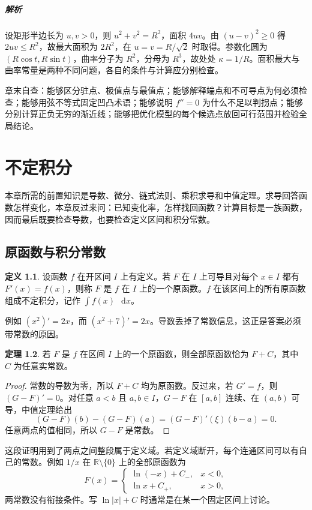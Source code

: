 \documentclass[UTF8,fontset=fandol,12pt,oneside,openany]{ctexrep}
\newcommand{\R}{\mathbb R}
\newcommand{\dd}{\mathop{}\!\mathrm d}
\theoremstyle{definition}
\newtheorem{theorem}{定理}[chapter]
\newtheorem{definition}[theorem]{定义}
\begin{document}
\paragraph{解析}设矩形半边长为 $u,v>0$，则 $u^2+v^2=R^2$，面积 $4uv$。由 $(u-v)^2\ge0$ 得 $2uv\le R^2$，故最大面积为 $2R^2$，在 $u=v=R/\sqrt2$ 时取得。参数化圆为 $(R\cos t,R\sin t)$，曲率分子为 $R^2$，分母为 $R^3$，故处处 $\kappa=1/R$。面积最大与曲率常量是两种不同问题，各自的条件与计算应分别检查。

章末自查：能够区分驻点、极值点与最值点；能够解释端点和不可导点为何必须检查；能够用弦不等式固定凹凸术语；能够说明 $f''=0$ 为什么不足以判拐点；能够分别计算正负无穷的渐近线；能够把优化模型的每个候选点放回可行范围并检验全局结论。


\chapter{不定积分}
\label{lec:10:chapter}

本章所需的前置知识是导数、微分、链式法则、乘积求导和中值定理。求导回答函数怎样变化，本章反过来问：已知变化率，怎样找回函数？计算目标是一族函数，因而最后既要检查导数，也要检查定义区间和积分常数。

\section{原函数与积分常数}
\begin{definition}
设函数 $f$ 在开区间 $I$ 上有定义。若 $F$ 在 $I$ 上可导且对每个 $x\in I$ 都有 $F'(x)=f(x)$，则称 $F$ 是 $f$ 在 $I$ 上的一个原函数。$f$ 在该区间上的所有原函数组成不定积分，记作 $\int f(x)\,\dd x$。
\end{definition}
例如 $(x^2)'=2x$，而 $(x^2+7)'=2x$。导数丢掉了常数信息，这正是答案必须带常数的原因。
\begin{theorem}
若 $F$ 是 $f$ 在区间 $I$ 上的一个原函数，则全部原函数恰为 $F+C$，其中 $C$ 为任意实常数。
\end{theorem}
\begin{proof}
常数的导数为零，所以 $F+C$ 均为原函数。反过来，若 $G'=f$，则 $(G-F)'=0$。对任意 $a<b$ 且 $a,b\in I$，$G-F$ 在 $[a,b]$ 连续、在 $(a,b)$ 可导，中值定理给出
\[
(G-F)(b)-(G-F)(a)=(G-F)'(\xi)(b-a)=0.
\]
任意两点的值相同，所以 $G-F$ 是常数。
\end{proof}
这段证明用到了两点之间整段属于定义域。若定义域断开，每个连通区间可以有自己的常数。例如 $1/x$ 在 $\R\setminus\{0\}$ 上的全部原函数为
\[
F(x)=\begin{cases}\ln(-x)+C_-,&x<0,\\ \ln x+C_+,&x>0,\end{cases}
\]
两常数没有衔接条件。写 $\ln|x|+C$ 时通常是在某一个固定区间上讨论。
\end{document}
